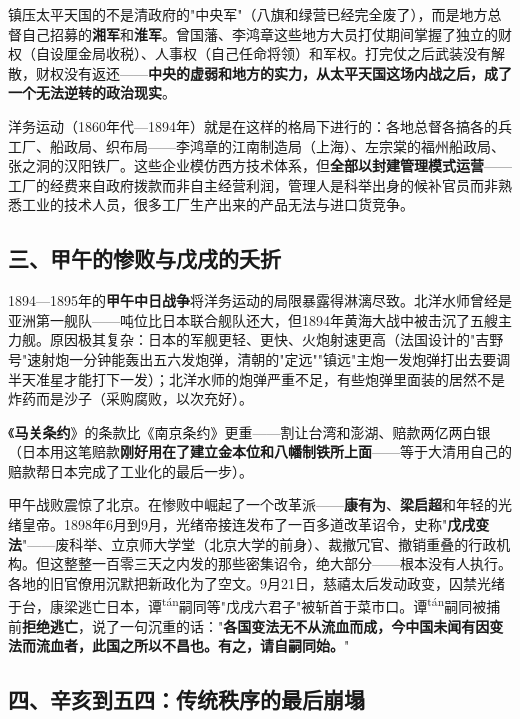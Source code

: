 \documentclass[a4paper,12pt]{ctexart}
\newcommand{\ruby}[2]{#1\textsuperscript{#2}}
\begin{document}
镇压太平天国的不是清政府的"中央军"（八旗和绿营已经完全废了），而是地方总督自己招募的\textbf{湘军}和\textbf{淮军}。曾国藩、李鸿章这些地方大员打仗期间掌握了独立的财权（自设厘金局收税）、人事权（自己任命将领）和军权。打完仗之后武装没有解散，财权没有返还——\textbf{中央的虚弱和地方的实力，从太平天国这场内战之后，成了一个无法逆转的政治现实}。

洋务运动（1860年代—1894年）就是在这样的格局下进行的：各地总督各搞各的兵工厂、船政局、织布局——李鸿章的江南制造局（上海）、左宗棠的福州船政局、张之洞的汉阳铁厂。这些企业模仿西方技术体系，但\textbf{全部以封建管理模式运营}——工厂的经费来自政府拨款而非自主经营利润，管理人是科举出身的候补官员而非熟悉工业的技术人员，很多工厂生产出来的产品无法与进口货竞争。

\subsection*{三、甲午的惨败与戊戌的夭折}

1894—1895年的\textbf{甲午中日战争}将洋务运动的局限暴露得淋漓尽致。北洋水师曾经是亚洲第一舰队——吨位比日本联合舰队还大，但1894年黄海大战中被击沉了五艘主力舰。原因极其复杂：日本的军舰更轻、更快、火炮射速更高（法国设计的"吉野号"速射炮一分钟能轰出五六发炮弹，清朝的"定远""镇远"主炮一发炮弹打出去要调半天准星才能打下一发）；北洋水师的炮弹严重不足，有些炮弹里面装的居然不是炸药而是沙子（采购腐败，以次充好）。

《\textbf{马关条约}》的条款比《南京条约》更重——割让台湾和澎湖、赔款两亿两白银（日本用这笔赔款\textbf{刚好用在了建立金本位和八幡制铁所上面}——等于大清用自己的赔款帮日本完成了工业化的最后一步）。

甲午战败震惊了北京。在惨败中崛起了一个改革派——\textbf{康有为}、\textbf{梁启超}和年轻的光绪皇帝。1898年6月到9月，光绪帝接连发布了一百多道改革诏令，史称"\textbf{戊戌变法}"——废科举、立京师大学堂（北京大学的前身）、裁撤冗官、撤销重叠的行政机构。但这整整一百零三天之内发的那些密集诏令，绝大部分——根本没有人执行。各地的旧官僚用沉默把新政化为了空文。9月21日，慈禧太后发动政变，囚禁光绪于台，康梁逃亡日本，\ruby{谭}{tán}嗣同等"戊戌六君子"被斩首于菜市口。\ruby{谭}{tán}嗣同被捕前\textbf{拒绝逃亡}，说了一句沉重的话："\textbf{各国变法无不从流血而成，今中国未闻有因变法而流血者，此国之所以不昌也。有之，请自嗣同始。}"

\subsection*{四、辛亥到五四：传统秩序的最后崩塌}
\end{document}
